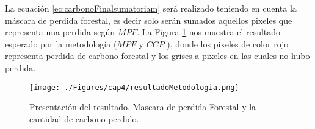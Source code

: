 
La ecuaci\'on  \ref{ec:carbonoFinalsumatoriam} ser\'a realizado teniendo en cuenta la m\'ascara de perdida forestal, es decir solo ser\'an sumados aquellos pixeles que representa una perdida seg\'un $ MPF $. La Figura \ref{fig:resulPC} nos muestra el resultado esperado por la metodolog\'ia ($ MPF $ y $ CCP $ ), donde los pixeles de color rojo representa perdida de carbono forestal y los grises a pixeles en las cuales no hubo perdida.
\begin{figure}[H]
	\centering
	\texttt{[image: ./Figures/cap4/resultadoMetodologia.png]}
	\caption{Presentaci\'on del resultado. Mascara de perdida Forestal y la cantidad de carbono perdido.}
	\label{fig:resulPC}
\end{figure}
